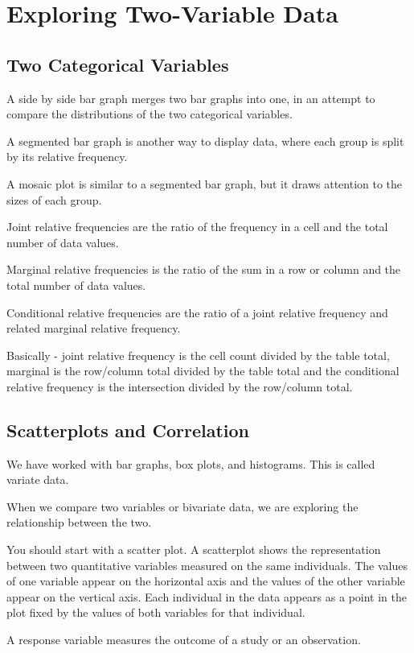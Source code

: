 \documentclass[../stats.tex]{subfiles}
\begin{document}
\chapter{Exploring Two-Variable Data}
\section{Two Categorical Variables}
A side by side bar graph merges two bar graphs into one, in an attempt to compare the distributions of the two categorical variables.

A segmented bar graph is another way to display data, where each group is split by its relative frequency. 

A mosaic plot is similar to a segmented bar graph, but it draws attention to the sizes of each group.

Joint relative frequencies are the ratio of the frequency in a cell and the total number of data values.

Marginal relative frequencies is the ratio of the sum in a row or column and the total number of data values.

Conditional relative frequencies are the ratio of a joint relative frequency and related marginal relative frequency.

Basically - joint relative frequency is the cell count divided by the table total, 
marginal is the row/column total divided by the table total and the conditional 
relative frequency is the intersection divided by the row/column total.

\section{Scatterplots and Correlation}
We have worked with bar graphs, box plots, and histograms. This is called variate data.

When we compare two variables or bivariate data, we are exploring the relationship between the two. 

You should start with a scatter plot. A scatterplot shows the representation between 
two quantitative variables measured on the same individuals. The values of one variable 
appear on the horizontal axis and the values of the other variable appear on the vertical axis. 
Each individual in the data appears as a point in the plot fixed by the values of both variables for that individual.

A response variable measures the outcome of a study or an observation.
\end{document}
